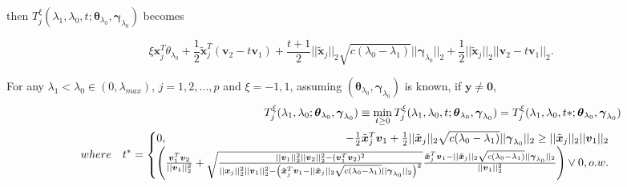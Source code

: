 then $T^\xi_j(\lambda_1,\lambda_0,t;\boldsymbol\theta_{\lambda_0},\boldsymbol\gamma_{\lambda_0})$ becomes

\begin{equation}
    \label{eq:txi.alt}
    \xi\boldsymbol x_j^T\theta_{\lambda_0}+\frac{1}{2} \tilde{\boldsymbol x}_j^T(\boldsymbol v_2-t \boldsymbol v_1)+\frac{t+1}{2}||\tilde{\boldsymbol x}_j||_2\sqrt{c(\lambda_0-\lambda_1)}||\boldsymbol\gamma_{\lambda_0}||_2+\frac{1}{2}||\tilde{\boldsymbol x}_j||_2||\boldsymbol v_2-t\boldsymbol v_1||_2.
\end{equation}

\begin{theorem}
    \label{thm:2.4}
    For any $\lambda_1<\lambda_{0}\in (0,\lambda_{max})$, $j=1,2,...,p$ and $\xi=-1,1$, assuming $(\boldsymbol\theta_{\lambda_0},\boldsymbol\gamma_{\lambda_0})$ is known, if $\boldsymbol y\neq \boldsymbol 0$,
    \begin{gather}
        \begin{aligned}
            T^\xi_j(\lambda_1,\lambda_0;\boldsymbol\theta_{\lambda_0},\boldsymbol\gamma_{\lambda_0})\equiv\underset{t\geq 0}{\mathrm{min}}\,T^\xi_j(\lambda_1,\lambda_0,t;\boldsymbol\theta_{\lambda_0},\boldsymbol\gamma_{\lambda_0})=T^\xi_j(\lambda_1,\lambda_0,t*;\boldsymbol\theta_{\lambda_0},\boldsymbol\gamma_{\lambda_0})\\
            where\quad t^*=\begin{cases}
            0,\hfill -\frac{1}{2}\tilde{\boldsymbol x}_j^T\boldsymbol v_1+\frac{1}{2}||\tilde{\boldsymbol x}_j||_2\sqrt{c(\lambda_0-\lambda_1)}||\boldsymbol\gamma_{\lambda_0}||_2\geq ||\tilde{\boldsymbol x}_j||_2||\boldsymbol v_1||_2\\
            \left(\frac{\boldsymbol v_1^T\boldsymbol v_2}{||\boldsymbol v_1||_2^2}+\sqrt{\frac{||\boldsymbol v_1||_2^2||\boldsymbol v_2||_2^2-(\boldsymbol v_1^T\boldsymbol v_2)^2}{||\boldsymbol x_j||_2^2||\boldsymbol v_1||_2^2-\left(\tilde{\boldsymbol x}_j^T\boldsymbol v_1-||\tilde{\boldsymbol x}_j||_2\sqrt{c(\lambda_0-\lambda_1)}||\boldsymbol\gamma_{\lambda_0}||_2\right)^2}}\frac{\tilde{\boldsymbol x}_j^T\boldsymbol v_1-||\tilde{\boldsymbol x}_j||_2\sqrt{c(\lambda_0-\lambda_1)}||\boldsymbol\gamma_{\lambda_0}||_2}{||\boldsymbol v_1||_2^2}\right)\vee 0,\hfill o.w.
            \end{cases}
        \end{aligned}
    \end{gather}
\end{theorem}

